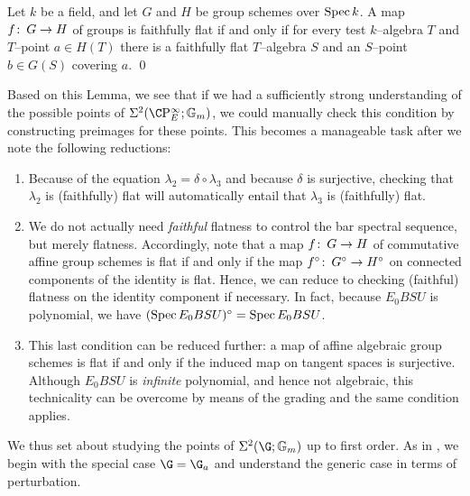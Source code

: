 \begin{lemma}
Let $k$ be a field, and let $G$ and $H$ be group schemes over $\operatorname{Spec} k$.  A map $f\colon\thinspace G \to H$ of groups is faithfully flat if and only if for every test $k$--algebra $T$ and $T$--point $a \in H(T)$ there is a faithfully flat $T$--algebra $S$ and an $S$--point $b \in G(S)$ covering $a$. \qed
\end{lemma}

\noindent Based on this Lemma, we see that if we had a sufficiently strong understanding of the possible points of $\Sigma^2(\CP^\infty_E; \Gm)$, we could manually check this condition by constructing preimages for these points.  This becomes a manageable task after we note the following reductions:
\begin{enumerate}
    \item Because of the equation $\lambda_2 = \delta \circ \lambda_3$ and because $\delta$ is surjective, checking that $\lambda_2$ is (faithfully) flat will automatically entail that $\lambda_3$ is (faithfully) flat.
    \item We do not actually need \emph{faithful} flatness to control the bar spectral sequence, but merely flatness.  Accordingly, note that a map $f\colon\thinspace G \to H$ of commutative affine group schemes is flat if and only if the map $f^\circ\colon\thinspace G^\circ \to H^\circ$ on connected components of the identity is flat.  Hence, we can reduce to checking (faithful) flatness on the identity component if necessary.  In fact, because $E_0 BSU$ is polynomial, we have $(\operatorname{Spec} E_0 BSU)^\circ = \operatorname{Spec} E_0 BSU$.
    \item This last condition can be reduced further: a map of affine algebraic group schemes is flat if and only if the induced map on tangent spaces is surjective.  Although $E_0 BSU$ is \emph{infinite} polynomial, and hence not algebraic, this technicality can be overcome by means of the grading and the same condition applies.
\end{enumerate}

We thus set about studying the points of $\Sigma^2(\G; \Gm)$ up to first order.  As in , we begin with the special case $\G = \G_a$ and understand the generic case in terms of perturbation.

